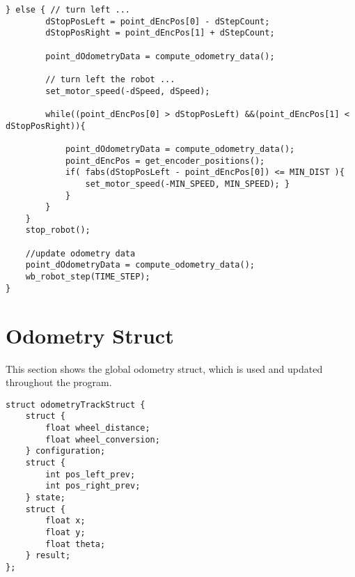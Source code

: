 \begin{lstlisting}[caption = {Turning an angle}]
	} else { // turn left ...
		dStopPosLeft = point_dEncPos[0] - dStepCount;
		dStopPosRight = point_dEncPos[1] + dStepCount;
		
		point_dOdometryData = compute_odometry_data();

		// turn left the robot ...
		set_motor_speed(-dSpeed, dSpeed);

		while((point_dEncPos[0] > dStopPosLeft) &&(point_dEncPos[1] < dStopPosRight)){

			point_dOdometryData = compute_odometry_data();
			point_dEncPos = get_encoder_positions();
			if( fabs(dStopPosLeft - point_dEncPos[0]) <= MIN_DIST ){
				set_motor_speed(-MIN_SPEED, MIN_SPEED); }
			}
		}
	}
	stop_robot();
	
	//update odometry data
	point_dOdometryData = compute_odometry_data();
	wb_robot_step(TIME_STEP);
}
\end{lstlisting}

\section{Odometry Struct}
\label{odometry_struct_code}
This section shows the global odometry struct, which is used and updated throughout the program. 
\begin{lstlisting}[caption = {Odometry struct}]
 struct odometryTrackStruct {
	struct {
		float wheel_distance;
		float wheel_conversion;
	} configuration;
	struct {
		int pos_left_prev;
		int pos_right_prev;
	} state;
	struct {
		float x;
		float y;
		float theta;
	} result;
};
\end{lstlisting}

